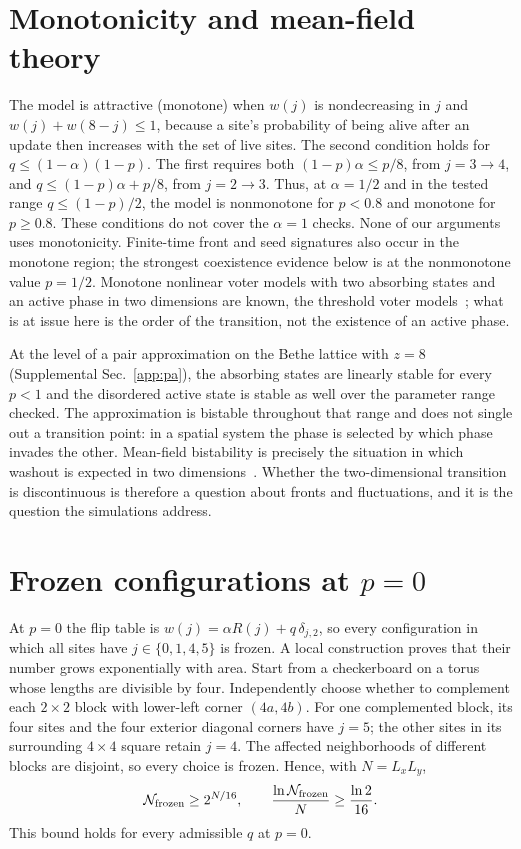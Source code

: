 \section{Monotonicity and mean-field theory}
\label{sec:mf}

The model is attractive (monotone) when $w(j)$ is nondecreasing in $j$ and $w(j)+w(8-j)\le 1$,
because a site's probability of being alive after an update then increases with the set of live
sites. The second condition holds for $q\le(1-\alpha)(1-p)$.
The first requires both $(1-p)\alpha\le p/8$, from $j=3\to4$,
and $q\le(1-p)\alpha+p/8$, from $j=2\to3$.
Thus, at $\alpha=1/2$ and in the tested range
$q\le(1-p)/2$, the model is nonmonotone for $p<0.8$ and monotone
for $p\ge0.8$. These conditions do not cover the $\alpha=1$ checks.
None of our arguments uses monotonicity. Finite-time front and seed signatures
also occur in the monotone region; the strongest coexistence evidence below
is at the nonmonotone value $p=1/2$.
Monotone nonlinear voter models with two absorbing states and an
active phase in two dimensions are known, the threshold voter
models~\cite{liggett1994}; what is at issue here is the order of the transition, not the
existence of an active phase.

At the level of a pair approximation on the Bethe lattice with $z = 8$ (Supplemental Sec.~\ref{app:pa}),
the absorbing states are linearly stable for every $p<1$ and the disordered active state is
stable as well over the parameter range checked. The approximation is bistable
throughout that range and does not single
out a transition point: in a spatial system the phase is selected by which phase invades the
other. Mean-field bistability is precisely the situation in which washout is expected in two
dimensions~\cite{castellano2009}. Whether the two-dimensional transition is discontinuous is
therefore a question about fronts and fluctuations, and it is the question the simulations
address.

\section{Frozen configurations at $p = 0$}
\label{app:frozen}

At $p = 0$ the flip table is $w(j) = \alpha R(j) + q\,\delta_{j,2}$, so every configuration in
which all sites have $j\in\{0,1,4,5\}$ is frozen. A local construction proves
that their number grows exponentially with area. Start from a checkerboard
on a torus whose lengths are divisible by four. Independently choose whether
to complement each $2\times2$ block with lower-left corner $(4a,4b)$.
For one complemented block, its four sites and the four exterior diagonal
corners have $j=5$; the other sites in its surrounding $4\times4$ square
retain $j=4$. The affected neighborhoods of different blocks are disjoint,
so every choice is frozen. Hence, with $N=L_xL_y$,
\begin{equation}
 \mathcal N_{\rm frozen}\ge 2^{N/16},\qquad
 \frac{\ln\mathcal N_{\rm frozen}}{N}\ge\frac{\ln2}{16}.
 \label{eq:frozenbound}
\end{equation}
This bound holds for every admissible $q$ at $p=0$.

